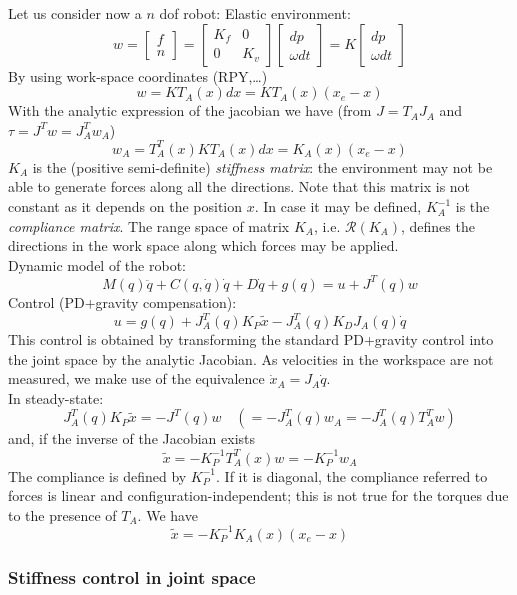 \documentclass{book}
\begin{document}
Let us consider now a $n$ dof robot: Elastic environment:
\[
    w=\begin{bmatrix}
        f \\ n
    \end{bmatrix}= \begin{bmatrix}
    K_f & 0 \\ 0 & K_v
    \end{bmatrix}\begin{bmatrix}
        dp \\ \omega dt
    \end{bmatrix} = K\begin{bmatrix}
        dp \\ \omega dt
    \end{bmatrix}
\]
By using work-space coordinates (RPY,\dots)
\[
    w = KT_A(x)dx = KT_A(x)(x_e-x)
\]
With the analytic expression of the jacobian we have (from $J=T_AJ_A$ and $\tau=J^Tw=J_A^Tw_A$)
\[
    w_A=T_A^T(x)KT_A(x)dx=K_A(x)(x_e-x)
\]
$K_A$ is the (positive semi-definite) \emph{stiffness matrix}: the environment may not be able to generate forces along all the directions. Note that this matrix is not constant as it depends on the position $x$. In case it may be defined, $K_A^{-1}$ is the \emph{compliance matrix}. The range space of matrix $K_A$, i.e. $\mathcal{R}(K_A)$, defines the directions in the work space along which forces may be applied. \\
Dynamic model of the robot: 
\[M(q)\ddot{q}+C(q,\dot{q})\dot{q}+D\dot{q}+g(q)=u+J^T(q)w\] 
Control (PD+gravity compensation): 
\[u=g(q)+J_A^T(q)K_P\tilde{x}-J_A^T(q)K_DJ_A(q)\dot{q}\]
This control is obtained by transforming the standard PD+gravity control into the joint space by the analytic Jacobian. As velocities in the workspace are not measured, we make use of the equivalence $\dot{x}_A=J_A\dot{q}$.\\
In steady-state:
\[
    J_A^T(q)K_P\tilde{x}=-J^T(q)w \quad (=-J_A^T(q)w_A=-J_A^T(q)T_A^Tw)
\]
and, if the inverse of the Jacobian exists
\[
    \tilde{x}=-K_P^{-1}T_A^T(x)w = -K_P^{-1}w_A
\]
The compliance is defined by $K_P^{-1}$. If it is diagonal, the compliance referred to forces is linear and configuration-independent; this is not true for the torques due to the presence of $T_A$. 
We have
\[
    \tilde{x}=-K_P^{-1}K_A(x)(x_e-x)
\]
\subsubsection{Stiffness control in joint space}
\end{document}
